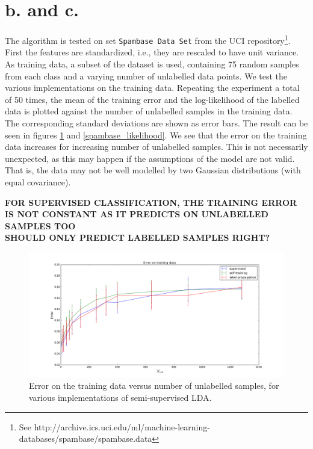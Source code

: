 \documentclass [a4paper] {report}
\begin{document}
	\section*{b. and c.}
	The algorithm is tested on set \texttt{Spambase Data Set} from the UCI repository\footnote{See http://archive.ics.uci.edu/ml/machine-learning-databases/spambase/spambase.data}.
	First the features are standardized, i.e., they are rescaled to have unit variance. As training data, a subset of the dataset is used, containing 75 random samples from each class and a varying number of unlabelled data points. We test the various implementations on the training data. Repeating the experiment a total of 50 times, the mean of the training error and the log-likelihood of the labelled data is plotted against the number of unlabelled samples in the training data. The corresponding standard deviations are shown as error bars. The result can be seen in figures \ref{spambase_error} and \ref{spambase_likelihood}. We see that the error on the training data increases for increasing number of unlabelled samples. This is not necessarily unexpected, as this may happen if the assumptions of the model are not valid. That is, the data may not be well modelled by two Gaussian distributions (with equal covariance).

	\textbf{FOR SUPERVISED CLASSIFICATION, THE TRAINING ERROR IS NOT CONSTANT AS IT PREDICTS ON UNLABELLED SAMPLES TOO}\\
	\textbf{SHOULD ONLY PREDICT LABELLED SAMPLES RIGHT?}
	\\
	\begin{figure}[H]
		\begin{center}
			\includegraphics[scale=0.3]{Images/spambase_train_error.png}
			\caption{Error on the training data versus number of unlabelled samples, for various implementations of semi-supervised LDA.}
			\label{spambase_error}
		\end{center}
	\end{figure}
\end{document}
